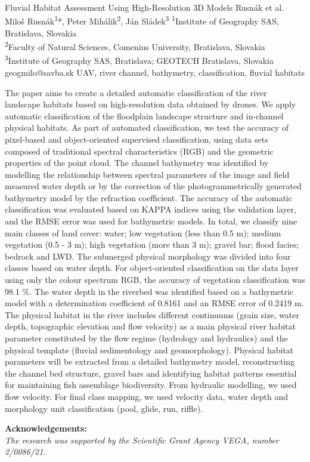 \abstract
{Fluvial Habitat Assessment Using High-Resolution 3D Models} %
{Rusnák et al.} %
{Miloš Rusnák\textsuperscript{1}*, Peter Mihálik\textsuperscript{2}, Ján Sládek\textsuperscript{3}} %
{\TLtag} %
{
\textsuperscript{1}Institute of Geography SAS, Bratislava, Slovakia\\
\textsuperscript{2}Faculty of Natural Sciences, Comenius University, Bratislava, Slovakia\\
\textsuperscript{3}Institute of Geography SAS, Bratislava; GEOTECH Bratislava, Slovakia
} %
{geogmilo@savba.sk}  %
{UAV, river channel, bathymetry, classification, fluvial habitats}%
{The paper aims to create a detailed automatic classification of the river landscape habitats based on high-resolution data obtained by drones. We apply automatic classification of the floodplain landscape structure and in-channel physical habitats. As part of automated classification, we test the accuracy of pixel-based and object-oriented supervised classification, using data sets composed of traditional spectral characteristics (RGB) and the geometric properties of the point cloud. The channel bathymetry was identified by modelling the relationship between spectral parameters of the image and field measured water depth or by the correction of the photogrammetrically generated bathymetry model by the refraction coefficient. The accuracy of the automatic classification was evaluated based on KAPPA indices using the validation layer, and the RMSE error was used for bathymetric models. In total, we classify nine main classes of land cover: water; low vegetation (less than 0.5 m); medium vegetation (0.5 - 3 m); high vegetation (more than 3 m); gravel bar; flood facies; bedrock and LWD. The submerged physical morphology was divided into four classes based on water depth. For object-oriented classification on the data layer using only the colour spectrum RGB, the accuracy of vegetation classification was 98.1 \%. The water depth in the riverbed was identified based on a bathymetric model with a determination coefficient of 0.8161 and an RMSE error of 0.2419 m. The physical habitat in the river includes different continuums (grain size, water depth, topographic elevation and flow velocity) as a main physical river habitat parameter constituted by the flow regime (hydrology and hydraulics) and the physical template (fluvial sedimentology and geomorphology). Physical habitat parameters will be extracted from a detailed bathymetry model, reconstructing the channel bed structure, gravel bars and identifying habitat patterns essential for maintaining fish assemblage biodiversity. From hydraulic modelling, we used flow velocity. For final class mapping, we used velocity data, water depth and morphology unit classification (pool, glide, run, riffle).
	
\vspace{0.5em}
\noindent
\textbf{Acknowledgements:}\\
\textit{The research was supported by the Scientific Grant Agency VEGA, number 2/0086/21.}
}%
{}%

